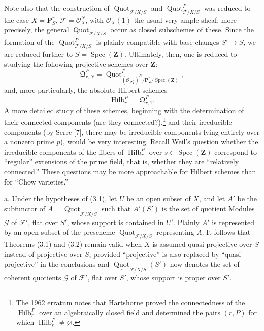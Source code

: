  Note also that the construction of
$\operatorname{Quot}_{\mathcal F/X/S}$ and
$\operatorname{Quot}^P_{\mathcal F/X/S}$ was reduced to the case
$X=\mathbf P^r_S$, $\mathcal F=\mathcal O_X^N$, with $\mathcal O_X(1)$ the
usual very ample sheaf; more precisely, the general
$\operatorname{Quot}_{\mathcal F/X/S}$ occur as closed subschemes of these.
Since the formation of the $\operatorname{Quot}^P_{\mathcal F/X/S}$ is plainly
compatible with base changes $S'\longrightarrow S$, we are reduced further to
$S=\operatorname{Spec}(\mathbf Z)$. Ultimately, then, one is reduced to
studying the following projective schemes over $\mathbf Z$:
\[
\mathfrak Q^P_{r,N}=
\operatorname{Quot}^{P}_{(\mathcal O_{\mathbf P^r_{\mathbf Z}})^N/
\mathbf P^r_{\mathbf Z}/\operatorname{Spec}(\mathbf Z)},
\]
and, more particularly, the absolute Hilbert schemes
\[
\operatorname{Hilb}^P_r=\mathfrak Q^P_{r,1}.
\]
A more detailed study of these schemes, beginning with the determination of
their connected components (are they connected?),\footnote{The 1962 erratum
notes that Hartshorne proved the connectedness of the
$\operatorname{Hilb}^P_r$ over an algebraically closed field and determined
the pairs $(r,P)$ for which $\operatorname{Hilb}^P_r\neq\varnothing$.} and
their irreducible components (by Serre [7], there may be irreducible components
lying entirely over a nonzero prime $p$), would be very interesting. Recall
Weil's question whether the irreducible components of the fibers of
$\operatorname{Hilb}^P_r$ over $s\in\operatorname{Spec}(\mathbf Z)$
correspond to “regular” extensions of the prime field, that is, whether they
are “relatively connected.” These questions may be more approachable for
Hilbert schemes than for “Chow varieties.”


\noindent a. Under the hypotheses of (3.1), let $U$ be an open subset of $X$,
and let $A'$ be the subfunctor of
$A=\underline{\operatorname{Quot}}_{\mathcal F/X/S}$ such that $A'(S')$ is the
set of quotient Modules $\mathcal G$ of $\mathcal F'$, flat over $S'$, whose
support is contained in $U'$. Plainly $A'$ is represented by an open subset of
the prescheme $\operatorname{Quot}_{\mathcal F/X/S}$ representing $A$. It
follows that Theorems (3.1) and (3.2)
remain valid when $X$ is assumed quasi-projective over $S$ instead of
projective over $S$, provided “projective” is also replaced by
“quasi-projective” in the conclusions and
$\underline{\operatorname{Quot}}_{\mathcal F/X/S}(S')$ now denotes the set of
coherent quotients $\mathcal G$ of $\mathcal F'$, flat over $S'$, whose support
is proper over $S'$.

